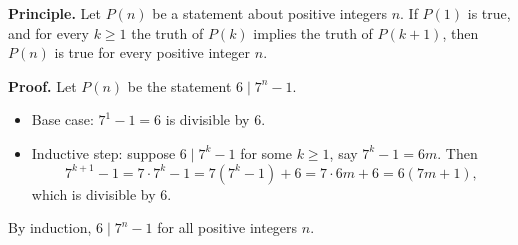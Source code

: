 \textbf{Principle.} Let $P(n)$ be a statement about positive integers $n$. If $P(1)$ is true, and for every $k\ge1$ the truth of $P(k)$ implies the truth of $P(k+1)$, then $P(n)$ is true for every positive integer $n$.

\textbf{Proof.} Let $P(n)$ be the statement $6\mid7^n-1$.
\begin{itemize}
\item Base case: $7^1-1=6$ is divisible by $6$.
\item Inductive step: suppose $6\mid7^k-1$ for some $k\ge1$, say $7^k-1=6m$. Then
\[
7^{k+1}-1=7\cdot7^k-1=7(7^k-1)+6=7\cdot6m+6=6(7m+1),
\]
which is divisible by $6$.
\end{itemize}
By induction, $\boxed{6\mid7^n-1}$ for all positive integers $n$.
